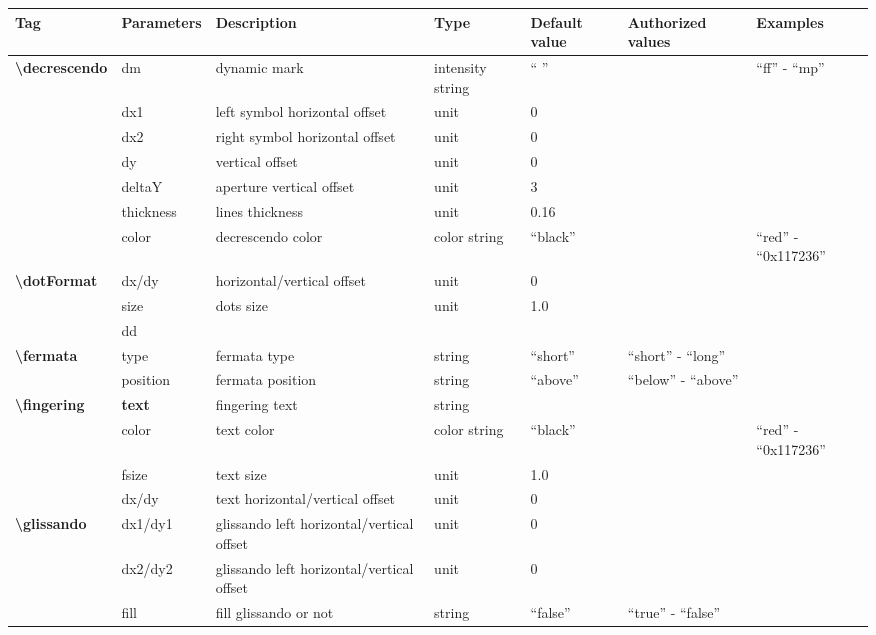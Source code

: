 \documentclass[a4paper, landscape, 10pt]{article}
\begin{document}
\begin{tabularx}{\linewidth}{p{3cm}p{2cm}p{5cm}p{3cm}p{3.5cm}p{3.5cm}p{4cm}}
    \hline
    \textbf{Tag}&\textbf{Parameters}&\textbf{Description}&\textbf{Type}&\textbf{Default value}&\textbf{Authorized values}&\textbf{Examples}\\
    \hline
    \textbf{\textbackslash{}decrescendo}&dm&dynamic mark&intensity string&`` ''&&``ff'' - ``mp''\\
    &dx1&left symbol horizontal offset&unit&0&&\\
    &dx2&right symbol horizontal offset&unit&0&&\\
    &dy&vertical offset&unit&0&&\\
    &deltaY&aperture vertical offset&unit&3&&\\
    &thickness&lines thickness&unit&0.16&&\\
    &color&decrescendo color&color string&``black''&&``red'' - ``0x117236''\\
    \hline    
    \textbf{\textbackslash{}dotFormat}&dx/dy&horizontal/vertical offset&unit&0&&\\
    &size&dots size&unit&1.0&&\\
    &dd&&&&&\\ %
    \hline
    \textbf{\textbackslash{}fermata}&type&fermata type&string&``short''&``short'' - ``long''&\\
    &position&fermata position&string&``above''&``below'' - ``above''&\\
    \hline
    \textbf{\textbackslash{}fingering}&\textbf{text}&fingering text&string&&&\\
    &color&text color&color string&``black''&&``red'' - ``0x117236''\\
    &fsize&text size&unit&1.0&&\\
    &dx/dy&text horizontal/vertical offset&unit&0&&\\
    \hline
    \textbf{\textbackslash{}glissando}&dx1/dy1&glissando left horizontal/vertical offset&unit&0&&\\
    &dx2/dy2&glissando left horizontal/vertical offset&unit&0&&\\
    &fill&fill glissando or not&string&``false''&``true'' - ``false''&\\

\end{tabularx}
\end{document}
